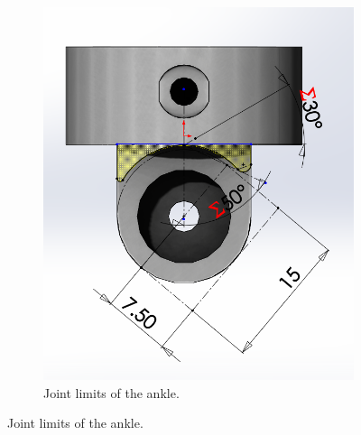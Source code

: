 \begin{figure}[ht!]
\begin{subfigure}[b]{0.49\textwidth}
        \includegraphics[width=\textwidth]{figures/joint_limits_ankle_upper.PNG}
        \caption{Joint limits of the ankle.}
        \label{fig:joint_limits_ankle_upper}
    \end{subfigure}
\end{figure}    

